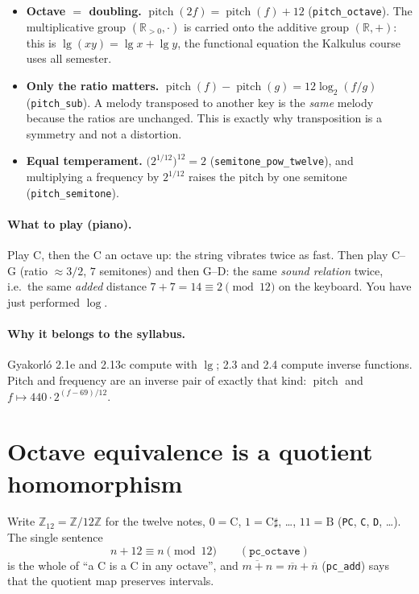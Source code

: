 \documentclass[11pt,a4paper]{article}
\newcommand{\Z}{\mathbb{Z}}
\newcommand{\R}{\mathbb{R}}
\newcommand{\PC}{\Z_{12}}
\newcommand{\lean}[1]{\texttt{#1}}
\begin{document}
\begin{itemize}[leftmargin=1.4em]
\item \textbf{Octave $=$ doubling.} $\operatorname{pitch}(2f)=\operatorname{pitch}(f)+12$
      (\lean{pitch\_octave}). The multiplicative group $(\R_{>0},\cdot)$ is carried onto
      the additive group $(\R,+)$: this is $\lg(xy)=\lg x+\lg y$, the functional
      equation the Kalkulus course uses all semester.
\item \textbf{Only the ratio matters.}
      $\operatorname{pitch}(f)-\operatorname{pitch}(g)=12\log_2(f/g)$ (\lean{pitch\_sub}).
      A melody transposed to another key is the \emph{same} melody because the ratios
      are unchanged. This is exactly why transposition is a symmetry and not a
      distortion.
\item \textbf{Equal temperament.} $\bigl(2^{1/12}\bigr)^{12}=2$
      (\lean{semitone\_pow\_twelve}), and multiplying a frequency by $2^{1/12}$ raises
      the pitch by one semitone (\lean{pitch\_semitone}).
\end{itemize}

\paragraph{What to play (piano).}
Play C, then the C an octave up: the string vibrates twice as fast. Then play
C--G (ratio $\approx 3/2$, $7$ semitones) and then G--D: the same \emph{sound
relation} twice, i.e.\ the same \emph{added} distance $7+7=14\equiv 2 \pmod{12}$
on the keyboard. You have just performed $\log$.

\paragraph{Why it belongs to the syllabus.}
Gyakorló 2.1e and 2.13c compute with $\lg$; 2.3 and 2.4 compute inverse
functions. Pitch and frequency are an inverse pair of exactly that kind:
$\operatorname{pitch}$ and $f\mapsto 440\cdot 2^{(f-69)/12}$.

\section{Octave equivalence is a quotient homomorphism}

Write $\PC=\Z/12\Z$ for the twelve notes, $0=\mathrm{C}$, $1=\mathrm{C}\sharp$,
\dots, $11=\mathrm{B}$ (\lean{PC}, \lean{C}, \lean{D}, \dots). The single
sentence
\[
  n+12 \equiv n \pmod{12} \qquad (\lean{pc\_octave})
\]
is the whole of ``a C is a C in any octave'', and
$\overline{m+n}=\overline{m}+\overline{n}$ (\lean{pc\_add}) says that the
quotient map preserves intervals.
\end{document}
